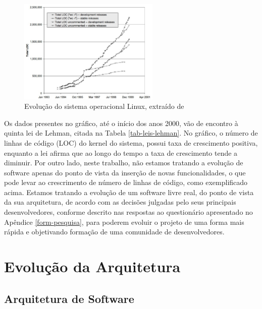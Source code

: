 \graphicspath{{figuras/}}
\begin{figure}[H]
\centering
\includegraphics[width=0.6\textwidth]{linux-evolution}
\caption{Evolução do sistema operacional Linux, extraído de \cite{godfrey2000evolution}}
\label{fig-evolucaolinux}
\end{figure}

Os dados presentes no gráfico, até o início dos anos 2000, vão de encontro à quinta lei de Lehman, citada na Tabela \ref{tab-leis-lehman}. No gráfico, o número de linhas de código (LOC) do kernel do sistema, possui taxa de crescimento positiva, enquanto a lei afirma que ao longo do tempo a taxa de crescimento tende a diminuir.
%
Por outro lado, neste trabalho, não estamos tratando a evolução de software apenas do ponto de vista da inserção de novas funcionalidades, o que pode levar ao crescrimento de número de linhas de código, como exemplificado acima. Estamos tratando a evolução de um software livre real, do ponto de vista da sua arquitetura, de acordo com as decisões julgadas pelo seus principais desenvolvedores, conforme descrito nas respostas ao questionário apresentado no Apêndice \ref{form-pesquisa}, para poderem evoluir o projeto de uma forma mais rápida e objetivando formação de uma comunidade de desenvolvedores.

\section{Evolução da Arquitetura}

\subsection{Arquitetura de Software}




